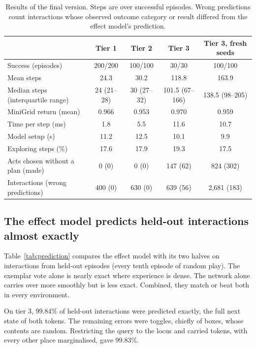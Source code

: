 \documentclass{article}
\begin{document}
\begin{table}[t]
    \caption{Results of the final version. Steps are over successful episodes. Wrong predictions count interactions whose observed outcome category or result differed from the effect model's prediction.}
    \centering
    \small
    \begin{tabular}{lcccc}
        \toprule
        & Tier 1 & Tier 2 & Tier 3 & Tier 3, fresh seeds \\
        \midrule
        Success (episodes) & 200/200 & 100/100 & 30/30 & 100/100 \\
        Mean steps & 24.3 & 30.2 & 118.8 & 163.9 \\
        Median steps (interquartile range) & 24 (21--28) & 30 (27--32) & 101.5 (67--166) & 138.5 (98--205) \\
        MiniGrid return (mean) & 0.966 & 0.953 & 0.970 & 0.959 \\
        Time per step (ms) & 1.8 & 5.5 & 11.6 & 10.7 \\
        Model setup (s) & 11.2 & 12.5 & 10.1 & 9.9 \\
        Exploring steps (\%) & 17.6 & 17.9 & 19.3 & 17.5 \\
        Acts chosen without a plan (made) & 0 (0) & 0 (0) & 147 (62) & 824 (302) \\
        Interactions (wrong predictions) & 400 (0) & 630 (0) & 639 (56) & 2,681 (183) \\
        \bottomrule
    \end{tabular}
    \label{tab:results}
\end{table}

\subsection{The effect model predicts held-out interactions almost exactly}

Table~\ref{tab:prediction} compares the effect model with its two halves on interactions from held-out episodes (every tenth episode of random play). The exemplar vote alone is nearly exact where experience is dense. The network alone carries over more smoothly but is less exact. Combined, they match or beat both in every environment.

On tier 3, 99.84\% of held-out interactions were predicted exactly, the full next state of both tokens. The remaining errors were toggles, chiefly of boxes, whose contents are random. Restricting the query to the locus and carried tokens, with every other place marginalised, gave 99.83\%.
\end{document}
